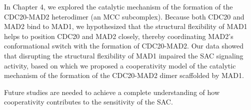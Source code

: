 In Chapter 4, we explored the catalytic mechanism of the formation of the CDC20-MAD2 heterodimer (an MCC subcomplex). Because both CDC20 and MAD2 bind to MAD1, we hypothesized that the structural flexibility of MAD1 helps to position CDC20 and MAD2 closely, thereby coordinating MAD2's conformational switch with the formation of CDC20-MAD2. Our data showed that disrupting the structural flexibility of MAD1 impaired the SAC signaling activity, based on which we proposed a cooperativity model of the catalytic mechanism of the formation of the CDC20-MAD2 dimer scaffolded by MAD1.

Future studies are needed to achieve a complete understanding of how cooperativity contributes to the sensitivity of the SAC.